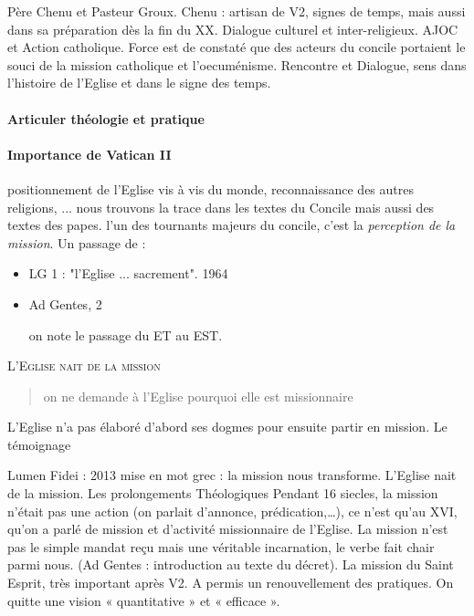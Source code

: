 Père Chenu et Pasteur Groux. Chenu : artisan de V2, signes de temps, mais aussi dans sa préparation dès la fin du XX. Dialogue culturel et inter-religieux. AJOC et Action catholique.
Force est de constaté que des acteurs du concile portaient le souci de la mission catholique et l’oecuménisme. Rencontre et Dialogue, sens dans l’histoire de l’Eglise et dans le signe des temps.

\paragraph{Articuler théologie et pratique}

\paragraph{Importance de Vatican II} positionnement de l'Eglise vis à vis du monde, reconnaissance des autres religions, ... nous trouvons la trace dans les textes du Concile mais aussi des textes des papes.
l'un des tournants majeurs du concile, c'est la \textit{perception de la mission}. Un passage de : 
\begin{itemize}
    \item LG 1 : "l'Eglise ... sacrement". 1964
    \item Ad Gentes, 2
    \begin{quote}
        
    \end{quote}
    on note le passage du ET au EST. 
\end{itemize}
\textsc{L'Eglise nait de la mission}
\begin{quote}
    on ne demande à l'Eglise pourquoi elle est missionnaire
\end{quote}
L'Eglise n'a pas élaboré d'abord ses dogmes pour ensuite partir en mission. Le témoignage



Lumen Fidei : 2013 mise en mot grec : la mission nous transforme. L’Eglise nait de la mission. 
Les prolongements Théologiques
Pendant 16 siecles, la mission n’était pas une action (on parlait d’annonce, prédication,…), ce n’est qu’au XVI, qu’on a parlé de mission et d’activité missionnaire de l’Eglise.
La mission n’est pas le simple mandat reçu mais une véritable incarnation, le verbe fait chair parmi nous. (Ad Gentes : introduction au texte du décret).
La mission du Saint Esprit, très important après V2. A permis un renouvellement des pratiques. On quitte une vision « quantitative » et « efficace ».

